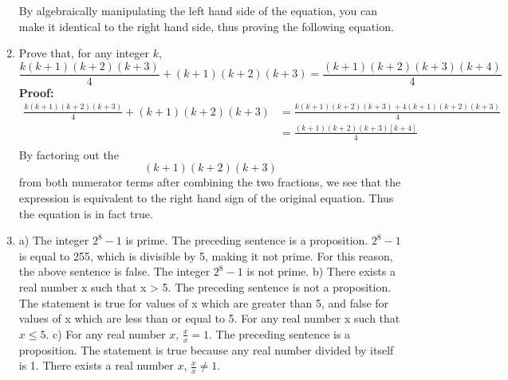 \documentclass{article}
\begin{document}
\begin{enumerate}
By algebraically manipulating the left hand side of the equation, you can make it identical to the right hand side, thus proving the following equation.
\newline
  \item Prove that, for any integer $k$, 
$$ \frac{k(k+1)(k+2)(k+3)}{4} + (k+1)(k+2)(k+3) =\frac{(k+1)(k+2)(k+3)(k+4)}{4}$$
\newline
\textbf{Proof:} 
\newline
\begin{align*}
   \frac{k(k+1)(k+2)(k+3)}{4} + (k+1)(k+2)(k+3) &= \frac{k(k+1)(k+2)(k+3)+4(k+1)(k+2)(k+3)}{4}\\
                                                &= \frac{(k+1)(k+2)(k+3)[k+4]}{4}\\
\end{align*}                                                
\newline
By factoring out the $$(k+1)(k+2)(k+3)$$ from both numerator terms after combining the two fractions, we see that the expression is equivalent to the right hand sign of the original equation. Thus the equation is in fact true.
\newpage
  \item 
  a) The integer $2^8-1$ is prime.
  \newline
  \newline
  The preceding sentence is a proposition.
  \newline
  \newline
  $2^8-1$ is equal to 255, which is divisible by 5, making it not prime. For this reason, the above sentence is false.
  \newline
  \newline
  The integer $2^8-1$ is not prime.
  \newline
  \newline
  \newline
  \newline
  b) There exists a real number x such that x > 5.
  \newline
  \newline
  The preceding sentence is not a proposition.
  \newline
  \newline
  The statement is true for values of x which are greater than 5, and false for values of x which are less than or equal to 5.
  \newline
  \newline
  For any real number x such that $x \leq 5$.
  \newline
  \newline
  \newline
  \newline
  c) For any real number $x$, $\frac{x}{x}=1$.
  \newline
  \newline
  The preceding sentence is a proposition.
  \newline
  \newline
  The statement is true because any real number divided by itself is 1.
  \newline
  \newline
  There exists a real number $x$, $\frac{x}{x}\neq1$.
\end{enumerate}
\end{document}
